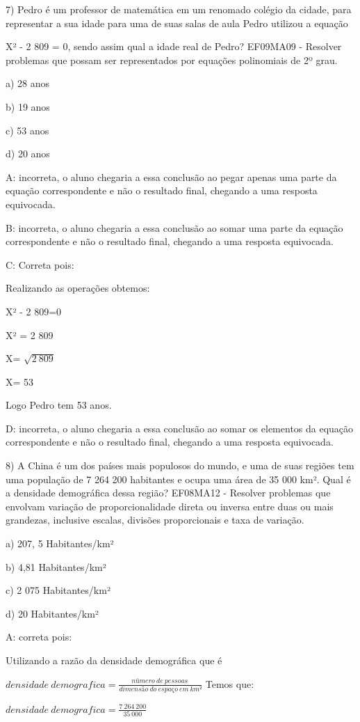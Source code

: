 7) Pedro é um professor de matemática em um renomado colégio da cidade,
para representar a sua idade para uma de suas salas de aula Pedro
utilizou a equação

X² - 2 809 = 0, sendo assim qual a idade real de Pedro? EF09MA09 -
Resolver problemas que possam ser representados por equações polinomiais
de 2º grau.

a) 28 anos

b) 19 anos

c) 53 anos

d) 20 anos

A: incorreta, o aluno chegaria a essa conclusão ao pegar apenas uma
parte da equação correspondente e não o resultado final, chegando a uma
resposta equivocada.

B: incorreta, o aluno chegaria a essa conclusão ao somar uma parte da
equação correspondente e não o resultado final, chegando a uma resposta
equivocada.

C: Correta pois:

Realizando as operações obtemos:

X² - 2 809=0

X² = 2 809

X= \(\sqrt{2\ 809}\)

X= 53

Logo Pedro tem 53 anos.

D: incorreta, o aluno chegaria a essa conclusão ao somar os elementos da
equação correspondente e não o resultado final, chegando a uma resposta
equivocada.

8) A China é um dos países mais populosos do mundo, e uma de suas
regiões tem uma população de 7 264 200 habitantes e ocupa uma área de 35
000 km². Qual é a densidade demográfica dessa região? EF08MA12 -
Resolver problemas que envolvam variação de proporcionalidade direta ou
inversa entre duas ou mais grandezas, inclusive escalas, divisões
proporcionais e taxa de variação.

a) 207, 5 Habitantes/km²

b) 4,81 Habitantes/km²

c) 2 075 Habitantes/km²

d) 20 Habitantes/km²

A: correta pois:

Utilizando a razão da densidade demográfica que é

\(densidade\ demografica = \frac{número\ de\ pessoas\ }{dimensão\ do\ espaço\ em\ km²}\)
Temos que:

\(densidade\ demografica = \frac{7\ 264\ 200}{35\ 000}\)

